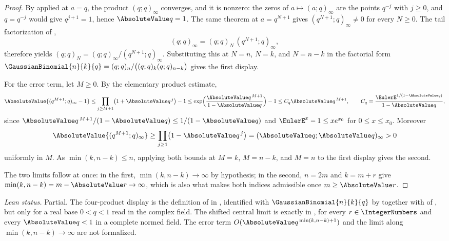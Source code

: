\documentclass[11pt,a4paper,oneside,openany]{book}
\theoremstyle{definition}
\theoremstyle{remark}
\begin{document}
\begin{proof}
By  applied at $a=q$, the product $(q;q)_\infty$
converges, and it is nonzero: the zeros of $a\mapsto(a;q)_\infty$ are the
points $q^{-j}$ with $j\ge0$, and $q=q^{-j}$ would give $q^{j+1}=1$, hence
$\AbsoluteValue q=1$.  The same theorem at $a=q^{N+1}$ gives $(q^{N+1};q)_\infty\ne0$
for every $N\ge0$.  The tail factorization of ,
\[
 (q;q)_\infty=(q;q)_N\,(q^{N+1};q)_\infty,
\]
therefore yields $(q;q)_N=(q;q)_\infty/(q^{N+1};q)_\infty$.  Substituting this
at $N=n$, $N=k$, and $N=n-k$ in the factorial form
$\GaussianBinomial{n}{k}{q}=(q;q)_n/\bigl((q;q)_k(q;q)_{n-k}\bigr)$ gives the first display.

For the error term, let $M\ge0$.  By the elementary product estimate,
\[
 \AbsoluteValue{(q^{M+1};q)_\infty-1}
 \le\prod_{j\ge M+1}\bigl(1+\AbsoluteValue q^{\,j}\bigr)-1
 \le\exp\Bigl(\frac{\AbsoluteValue q^{\,M+1}}{1-\AbsoluteValue q}\Bigr)-1
 \le C_q\AbsoluteValue q^{\,M+1},
 \qquad
 C_q=\frac{\EulerE^{1/(1-\AbsoluteValue q)}}{1-\AbsoluteValue q},
\]
since $\AbsoluteValue q^{\,M+1}/(1-\AbsoluteValue q)\le1/(1-\AbsoluteValue q)$ and $\EulerE^x-1\le xe^{x_0}$ for
$0\le x\le x_0$.  Moreover
\[
 \AbsoluteValue{(q^{M+1};q)_\infty}
 \ge\prod_{j\ge1}\bigl(1-\AbsoluteValue q^{\,j}\bigr)
 =(\AbsoluteValue q;\AbsoluteValue q)_\infty>0
\]
uniformly in $M$.  As $\min(k,n-k)\le n$, applying both bounds at $M=k$,
$M=n-k$, and $M=n$ to the first display gives the second.

The two limits follow at once: in the first, $\min(k,n-k)\to\infty$ by
hypothesis; in the second, $n=2m$ and $k=m+r$ give
$\min(k,n-k)=m-\AbsoluteValue r\to\infty$, which is also what makes both indices
admissible once $m\ge\AbsoluteValue r$.
\end{proof}
\emph{Lean status.}  Partial.  The four-product display is the definition of
 in , identified with
\(\GaussianBinomial{n}{k}{q}\) by  together with
 of , but only for
a real base \(0<q<1\) read in the complex field.  The shifted central limit is exactly
 in , for every
\(r\in\IntegerNumbers\) and every \(\AbsoluteValue q<1\) in a complete normed field.  The error term
\(O(\AbsoluteValue q^{\,\min(k,n-k)+1})\) and the limit along \(\min(k,n-k)\to\infty\) are not formalized.
\end{document}
